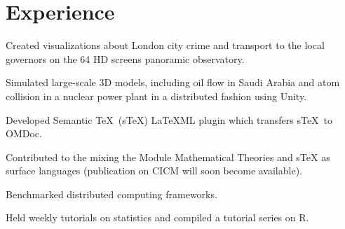 \documentclass[]{deedy-resume-openfont}
\begin{document}
\hfill
\begin{minipage}[t]{0.66\textwidth} 


\section{Experience}

\vspace{\topsep} %
\begin{tightemize}
\item Created visualizations about London city crime and transport to the local governors on the 64 HD 
screens panoramic observatory. 
\item Simulated large-scale 3D models, including
oil flow in Saudi Arabia and atom collision in a nuclear power plant in a distributed fashion using Unity. 
\end{tightemize}
\sectionsep

\begin{tightemize}
\item Developed Semantic \TeX \ (sTeX) LaTeXML plugin which transfers 
 s\TeX\ to OMDoc.
 \item Contributed to the mixing the Module Mathematical Theories and sTeX
 as surface languages (publication on CICM will soon become available).
\end{tightemize}

\sectionsep

\begin{tightemize}
\item  Benchmarked distributed computing frameworks.
\item Held weekly tutorials on statistics and compiled a tutorial series on R.
\end{tightemize}
\sectionsep


\end{minipage}
\end{document}
